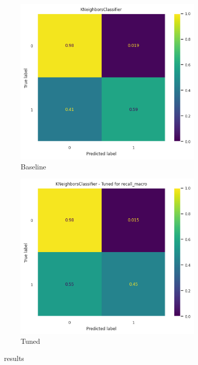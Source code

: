 \begin{frame}{\subsecname}
\begin{figure}
    \centering
    \begin{subfigure}[c]{0.4\textwidth}
        \includegraphics[width=\textwidth]{images/models/KNN_base.png}
        \caption{Baseline}
    \end{subfigure}
    \begin{subfigure}[c]{0.4\textwidth}
        \includegraphics[width=\textwidth]{images/models/KNN_tuned.png}
        \caption{Tuned}
    \end{subfigure}
    \caption{\subsecname\ results}
\end{figure}
\end{frame}

